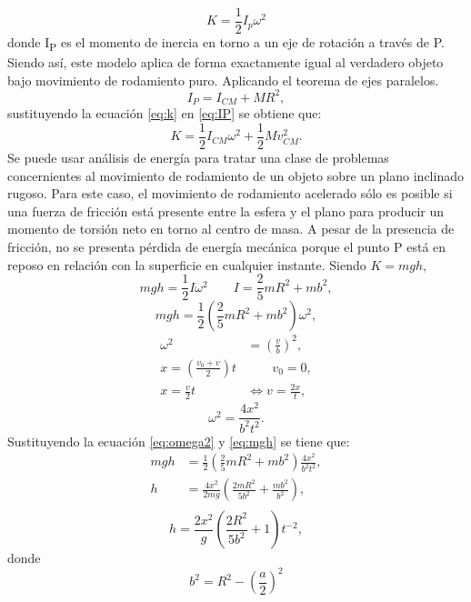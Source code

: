 \begin{equation}
    K=\frac{1}{2} I_p \omega^2
    \label{eq:k}
\end{equation}
donde I\textsubscript{P} es el momento de inercia en torno a un eje de rotación a través de P. Siendo así, este modelo
aplica de forma exactamente igual al verdadero objeto bajo movimiento de rodamiento puro. Aplicando
el teorema de ejes paralelos.
\begin{equation}
    I_P= I_{CM} + MR^2,
    \label{eq:IP}
\end{equation}
sustituyendo la ecuación \ref{eq:k} en \ref{eq:IP} se obtiene que:
\begin{equation*}
    K= \frac{1}{2}I_{CM} \omega^2+\frac{1}{2}Mv_{CM}^2.
\end{equation*}
Se puede usar análisis de energía para tratar una clase de problemas concernientes al movimiento de
rodamiento de un objeto sobre un plano inclinado rugoso. Para este caso, el movimiento de rodamiento
acelerado sólo es posible si una fuerza de fricción está presente entre la esfera y el plano para producir
un momento de torsión neto en torno al centro de masa. A pesar de la presencia de fricción, no se presenta
pérdida de energía mecánica porque el punto P está en reposo en relación con la superficie en cualquier
instante. Siendo $K = mgh$,
\begin{equation*}
    mgh=\frac{1}{2} I \omega^2 \qquad I=\frac{2}{5}mR^2+mb^2,
\end{equation*}
\begin{equation}
    mgh= \frac{1}{2}\left(\frac{2}{5}mR^2+mb^2 \right)\omega^2,
    \label{eq:mgh}
\end{equation}
\begin{align*}
    \omega^2 &= \left(\frac{v}{b}\right)^2,\\
    x=\left(\frac{v_0+v}{2}\right)t &\qquad v_0=0,\\
    x=\frac{v}{2}t &\Leftrightarrow  v=\frac{2x}{t},
\end{align*}
\begin{equation}
    \omega^2=\frac{4x^2}{b^2t^2}.
    \label{eq:omega2}
\end{equation}
Sustituyendo la ecuación \ref{eq:omega2} y \ref{eq:mgh} se tiene que:
\begin{align*}
    mgh&= \frac{1}{2}\left(\frac{2}{5}mR^2+mb^2 \right)\frac{4x^2}{b^2t^2},\\
    h & = \frac{4x^2}{2mg}\left(\frac{2mR^2}{5b^2}+\frac{mb^2}{b^2}\right),\\
\end{align*}
\begin{equation}
    h=\frac{2x^2}{g}\left(\frac{2R^2}{5b^2}+1 \right)t^{-2},
    \label{eq:h}
\end{equation}
donde
\begin{equation*}
    b^2=R^2-\left(\frac{a}{2}\right)^2
\end{equation*}